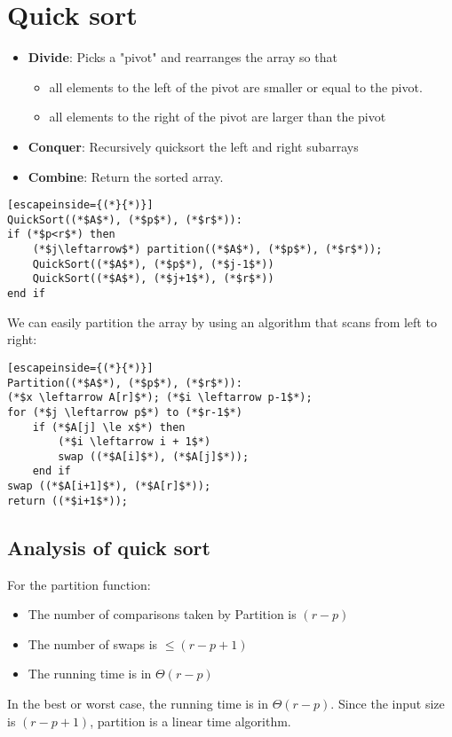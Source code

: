 \documentclass[a4paper]{article}
\begin{document}
\section{Quick sort}
\begin{itemize}
	\item[] \textbf{Divide}: Picks a "pivot" and rearranges the array so that
	\begin{itemize}
		\item all elements to the left of the pivot are smaller or equal to the pivot.
		\item all elements to the right of the pivot are larger than the pivot
	\end{itemize}
	\item[] \textbf{Conquer}: Recursively quicksort the left and right subarrays
	\item[] \textbf{Combine}: Return the sorted array.
\end{itemize}
\begin{lstlisting}[escapeinside={(*}{*)}]
QuickSort((*$A$*), (*$p$*), (*$r$*)):
if (*$p<r$*) then
	(*$j\leftarrow$*) partition((*$A$*), (*$p$*), (*$r$*));
	QuickSort((*$A$*), (*$p$*), (*$j-1$*))
	QuickSort((*$A$*), (*$j+1$*), (*$r$*))
end if
\end{lstlisting}
We can easily partition the array by using an algorithm that scans from left to right:
\begin{lstlisting}[escapeinside={(*}{*)}]
Partition((*$A$*), (*$p$*), (*$r$*)):
(*$x \leftarrow A[r]$*); (*$i \leftarrow p-1$*);
for (*$j \leftarrow p$*) to (*$r-1$*)
	if (*$A[j] \le x$*) then
		(*$i \leftarrow i + 1$*)
		swap ((*$A[i]$*), (*$A[j]$*));
	end if
swap ((*$A[i+1]$*), (*$A[r]$*));
return ((*$i+1$*));
\end{lstlisting}
\subsection{Analysis of quick sort}
For the partition function:
\begin{itemize}
	\item The number of comparisons taken by Partition is $(r-p)$
	\item The number of swaps is $\le (r-p+1)$
	\item The running time is in $\Theta(r-p)$
\end{itemize}
In the best or worst case, the running time is in $\Theta(r-p)$. Since the input size is $(r-p+1)$, partition is a linear time algorithm.
\end{document}
